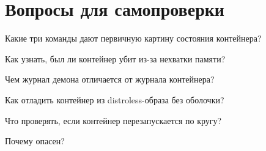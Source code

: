 \section*{Вопросы для самопроверки}
\begin{selfcheck}
  \item Какие три команды дают первичную картину состояния контейнера?
  \item Как узнать, был ли контейнер убит из-за нехватки памяти?
  \item Чем журнал демона отличается от журнала контейнера?
  \item Как отладить контейнер из distroless-образа без оболочки?
  \item Что проверять, если контейнер перезапускается по кругу?
  \item Почему  опасен?
\end{selfcheck}
